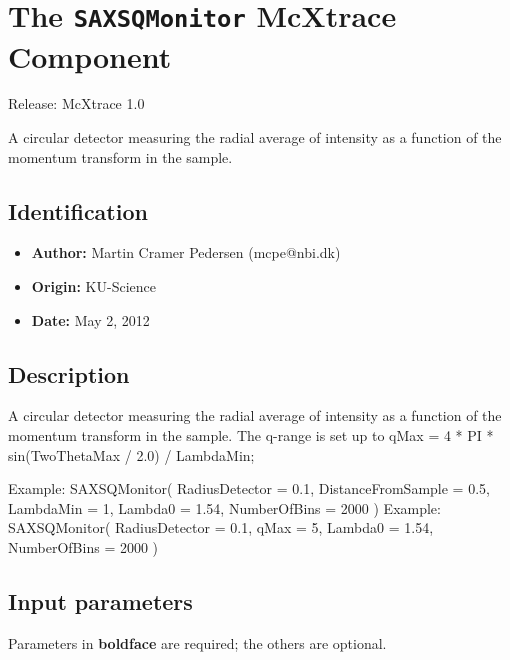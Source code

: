 \section{The \texttt{SAXSQMonitor} McXtrace Component}
Release: McXtrace 1.0

A circular detector measuring the radial average of intensity as a function
of the momentum transform in the sample.

\subsection*{Identification}
\begin{itemize}
  \item \textbf{Author:} Martin Cramer Pedersen (mcpe@nbi.dk)
  \item \textbf{Origin:} KU-Science
  \item \textbf{Date:} May 2, 2012
\end{itemize}

\subsection*{Description}
A circular detector measuring the radial average of intensity as a function of the momentum transform in the sample. The q-range is set up to qMax = 4 * PI * sin(TwoThetaMax / 2.0) / LambdaMin;

Example: SAXSQMonitor( RadiusDetector = 0.1, DistanceFromSample = 0.5, LambdaMin = 1, Lambda0 = 1.54, NumberOfBins = 2000 ) Example: SAXSQMonitor( RadiusDetector = 0.1, qMax = 5, Lambda0 = 1.54, NumberOfBins = 2000 )

\subsection*{Input parameters}
Parameters in \textbf{boldface} are required; the others are optional.

